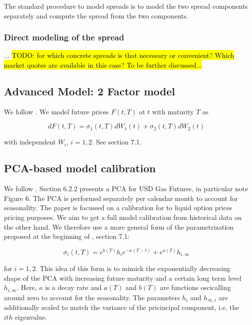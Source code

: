 \documentclass{amsart}
\theoremstyle{plain}
\numberwithin{equation}{section}
\begin{document}
The standard procedure to model spreads is to model the two spread components separately and compute the spread from the two components.


\subsubsection{Direct modeling of the spread}

... \hl{TODO: for which concrete spreads is that necessary or convenient? Which market quotes are available in this case? To be further discussed...}


\subsection{Advanced Model: 2 Factor model}

We follow \cite{Andersen_2007}. We model future prices $F(t,T)$ at $t$ with maturity $T$ as

\begin{equation}
dF(t,T) = \sigma_1(t,T) dW_1(t) + \sigma_2(t,T) dW_2(t)
\end{equation}

with independent $W_i$, $i=1,2$. See \cite{Andersen_2007} section 7.1.


\subsection{PCA-based model calibration}

We follow \cite{Andersen_2007}. Section 6.2.2 presents a PCA for USD Gas Futures, in particular note Figure 6. The PCA
is performed separately per calendar month to account for seasonality. The paper is focussed on a calibration for to
liquid option prices pricing purposes. We aim to get a full model calibration from historical data on the other hand. We
therefore use a more general form of the parametrization proposed at the beginning of \cite{Andersen_2007}, section 7.1:

\begin{equation}\label{comm_parametrization}
\sigma_i(t,T) = e^{b(T)}h_ie^{-\kappa(T-t)} + e^{a(T)}h_{i,\infty}
\end{equation}

for $i=1,2$. This idea of this form is to mimick the exponentially decreasing shape of the PCA with increasing future
maturity and a certain long term level $h_{i,\infty}$. Here, $\kappa$ is a decay rate and $a(T)$ and $b(T)$ are functions
oscicalling around zero to account for the seasonality. The parameters $h_i$ and $h_{\infty,i}$ are additionally scaled to
match the variance of the pricincipal component, i.e. the $ith$ eigenvalue.
\end{document}
